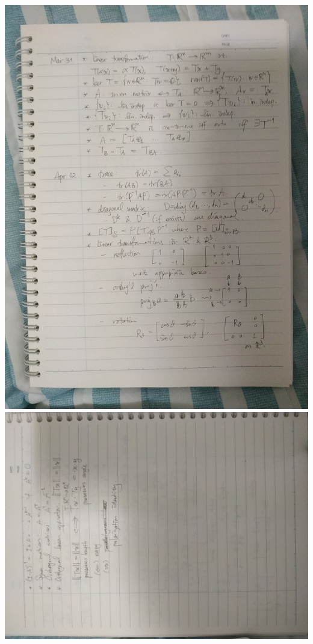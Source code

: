 \documentclass{homework}
\begin{document}
\includegraphics[width=\textwidth,origin=c]{note1.jpg}
\includegraphics[height=\textwidth,angle=-90,origin=c]{note2.jpg}
\end{document}
